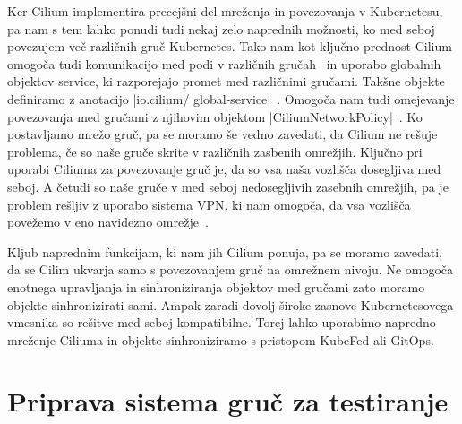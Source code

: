 \documentclass[a4paper, 12pt]{book}
\begin{document}
Ker Cilium implementira precejšni del mreženja in povezovanja v Kubernetesu, pa nam s tem lahko ponudi tudi nekaj zelo naprednih možnosti, ko med seboj povezujem več različnih gruč Kubernetes.
Tako nam kot ključno prednost Cilium omogoča tudi komunikacijo med podi v različnih gručah~\cite{cilium-cluster-mesh} in uporabo globalnih objektov service, ki razporejajo promet med različnimi gručami.
Takšne objekte definiramo z anotacijo \spverb|io.cilium/ global-service|~\cite{setup-cilium-cluster-mesh}.
Omogoča nam tudi omejevanje povezovanja med gru\-ča\-mi z njihovim objektom \spverb|CiliumNetworkPolicy|~\cite{setup-cilium-cluster-mesh}.
Ko postavljamo mre\-žo gruč, pa se moramo še vedno zavedati, da Cilium ne rešuje problema, če so naše gruče skrite v različnih zasbenih omrežjih.
Ključno pri uporabi Ciliuma za povezovanje gruč je, da so vsa naša vozlišča dosegljiva med seboj.
A četudi so naše gruče v med seboj nedosegljivih zasebnih omrežjih, pa je problem rešljiv z uporabo sistema VPN, ki nam omogoča, da vsa vozlišča povežemo v eno navidezno omrežje~\cite{setup-cilium-cluster-mesh}.

Kljub naprednim funkcijam, ki nam jih Cilium ponuja, pa se moramo zavedati, da se Cilim ukvarja samo s povezovanjem gruč na omrežnem nivoju.
Ne omogoča enotnega upravljanja in sinhroniziranja objektov med gručami zato moramo objekte sinhronizirati sami.
Ampak zaradi dovolj široke zasnove Kubernetesovega vmesnika so rešitve med seboj kompatibilne.
Torej lahko uporabimo napredno mreženje Ciliuma in objekte sinhroniziramo s pristopom KubeFed ali GitOps.
\chapter{Priprava sistema gruč za testiranje}
\end{document}
